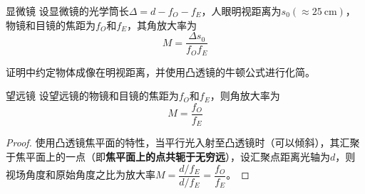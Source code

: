 \begin{myprop}{ 显微镜}{}
	设显微镜的光学筒长$\Delta=d-f_{O}-f_{E}$，人眼明视距离为$s_{0}(\approx \SI{25}{\cm})$，物镜和目镜的焦距为$f_{O}$和$f_{E}$，其角放大率为
    \[
        M=\dfrac{\Delta s_0}{f_{O}f_{E}}
    \]
\end{myprop}
证明中约定物体成像在明视距离，并使用凸透镜的牛顿公式进行化简。


\begin{myprop}{ 望远镜}{}
    设望远镜的物镜和目镜的焦距为$f_{O}$和$f_{E}
    $，则角放大率为
    \[
        M=\dfrac{f_{O}}{f_{E}}    
    \]
\end{myprop}
\begin{proof}
    使用凸透镜焦平面的特性，当平行光入射至凸透镜时（可以倾斜），其汇聚于焦平面上的一点（即\textbf{焦平面上的点共轭于无穷远}），设汇聚点距离光轴为$d$，则视场角度和原始角度之比为放大率$M=\dfrac{d/f_{E}}{d/f_{E}}=\dfrac{f_{O}}{f_{E}}$。   
\end{proof}

